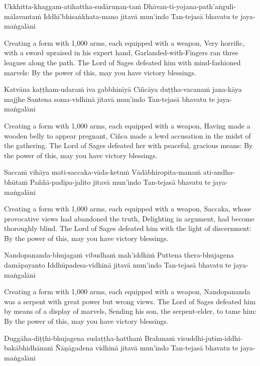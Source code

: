 Ukkhitta-khaggam-atihattha-sudāruṇan-taṁ
Dhāvan-ti-yojana-path’aṅguli-mālavantaṁ
Iddhī’bhisaṅkhata-mano jitavā mun’indo
Tan-tejasā bhavatu te jaya-maṅgalāni

\begin{english}
  Creating a form with 1,000 arms, each equipped with a weapon,
  Very horrific, with a sword upraised in his expert hand, Garlanded-with-Fingers ran three leagues along the path.
  The Lord of Sages defeated him with mind-fashioned marvels:
  By the power of this, may you have victory blessings.
\end{english}

Katvāna kaṭṭham-udaraṁ iva gabbhinīyā
Ciñcāya duṭṭha-vacanaṁ jana-kāya majjhe
Santena soma-vidhinā jitavā mun’indo
Tan-tejasā bhavatu te jaya-maṅgalāni

\begin{english}
  Creating a form with 1,000 arms, each equipped with a weapon,
  Having made a wooden belly to appear pregnant,
  Ciñca made a lewd accusation in the midst of the gathering.
  The Lord of Sages defeated her with peaceful, gracious means:
  By the power of this, may you have victory blessings.
\end{english}

Saccaṁ vihāya mati-saccaka-vāda-ketuṁ
Vādābhiropita-manaṁ ati-andha-bhūtaṁ
Paññā-padīpa-jalito jitavā mun’indo
Tan-tejasā bhavatu te jaya-maṅgalāni

\begin{english}
  Creating a form with 1,000 arms, each equipped with a weapon,
  Saccaka, whose provocative views had abandoned the truth, Delighting in argument, had become thoroughly blind.
  The Lord of Sages defeated him with the light of discernment:
  By the power of this, may you have victory blessings.
\end{english}

Nandopananda-bhujagaṁ vibudhaṁ mah’iddhiṁ
Puttena thera-bhujagena damāpayanto
Iddhūpadesa-vidhinā jitavā mun’indo
Tan-tejasā bhavatu te jaya-maṅgalāni

\begin{english}
  Creating a form with 1,000 arms, each equipped with a weapon,
  Nandopananda was a serpent with great power but wrong views.
  The Lord of Sages defeated him by means of a display of marvels, Sending his son, the serpent-elder, to tame him:
  By the power of this, may you have victory blessings.
\end{english}

Duggāha-diṭṭhi-bhujagena sudaṭṭha-hatthaṁ
Brahmaṁ visuddhi-jutim-iddhi-bakābhidhānaṁ
Ñāṇāgadena vidhinā jitavā mun’indo
Tan-tejasā bhavatu te jaya-maṅgalāni

